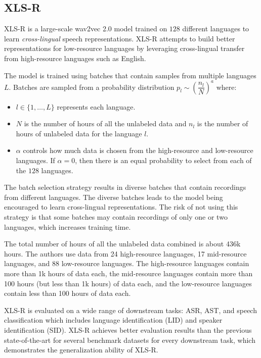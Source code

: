 \subsection{XLS-R}
XLS-R \cite{babu2021xls} is a large-scale wav2vec 2.0 model trained on $128$ different languages to learn \emph{cross-lingual} speech representations.
XLS-R attempts to build better representations for low-resource languages by leveraging cross-lingual transfer from high-resource languages such as English.

The model is trained using batches that contain samples from multiple languages $L$. 
Batches are sampled from a probability distribution $p_l \sim \left(\dfrac{n_l}{N}\right)^{a}$ where:
\begin{itemize}
    \item $l \in \{1, \dots, L\}$ represents each language.
    \item $N$ is the number of hours of all the unlabeled data and $n_l$ is the number of hours of unlabeled data for the language $l$.
    \item $\alpha$ controls how much data is chosen from the high-resource and low-resource languages. If $\alpha = 0$, then there is an equal probability to select from each of the $128$ languages. 
\end{itemize}
The batch selection strategy results in diverse batches that contain recordings from different languages.
The diverse batches leads to the model being encouraged to learn cross-lingual representations.
The risk of not using this strategy is that some batches may contain recordings of only one or two languages, which increases training time.

The total number of hours of all the unlabeled data combined is about 436k hours. The authors use data from 24 high-resource languages, 17 mid-resource languages, and 88 low-resource languages.
The high-resource languages contain more than 1k hours of data each, the mid-resource languages contain more than 100 hours (but less than 1k hours)
of data each, and the low-resource languages contain less than 100 hours of data each.

XLS-R is evaluated on a wide range of downstream tasks: ASR, AST, and speech classification which includes language identification (LID) and speaker identification (SID).
XLS-R achieves better evaluation results than the previous state-of-the-art for several benchmark datasets for every downstream task,
which demonstrates the generalization ability of XLS-R.